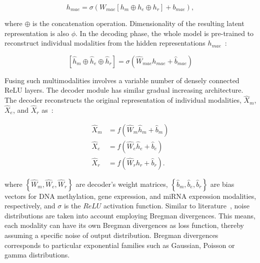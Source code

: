 \begin{equation}
    h_{mae}=\sigma\left(W_{mae}\left[h_{m} \oplus h_{e} \oplus h_{r}\right]+b_{mae}\right),
\end{equation}

\hspace*{3.5mm} where $\oplus$ is the concatenation operation. Dimensionality of the resulting latent representation is also $\phi$. In the decoding phase, the whole model is pre-trained to reconstruct individual modalities from the hidden representations $h_{mae}$~\cite{liu2016multimodal}:

\begin{equation}
    \left[\hat{h}_{m}\oplus \hat{h}_{e} \oplus \hat{h}_{r}
    \right]=\sigma\left(\hat W_{mae} h_{mae}+\hat {b}_{mae}\right)
\end{equation}

\hspace*{3.5mm} Fusing such multimodalities involves a variable number of densely connected ReLU layers. The decoder module has similar gradual increasing architecture. The decoder reconstructs the original representation of individual modalities, $\hat{X}_{m}$, $\hat{X}_{e}$, and $\hat{X}_{r}$ as~\cite{wang2018associativemulti}: 

\begin{equation}
    \begin{aligned}
        \hat{X}_{m} &=f\left(\hat W_{m} \hat{h}_{m}+\hat{b}_{m}\right) \\
        \hat{X}_{e} &=f\left(\hat W_{e} \hat{h}_{e}+\hat{b}_{e}\right) \\
        \hat{X}_{r} &=f\left(\hat W_{r} \hat{h}_{r}+\hat{b}_{r}\right).
        \end{aligned}
\end{equation}


\hspace*{3.5mm} where $\left\{\hat W_{m}, \hat W_{e}, \hat W_{r}\right\}$ are decoder's weight matrices, $\left\{\hat b_{m}, \hat b_{e}, \hat b_{r}\right\}$ are bias vectors for DNA methylation, gene expression, and miRNA expression modalities, respectively, and $\sigma$ is the $ReLU$ activation function. Similar to literature~\cite{wang2018associativemulti,serban2016multi}, noise distributions are taken into account employing Bregman divergences. This means, each modality can have its own Bregman divergences as loss function, thereby assuming a specific noise of output distribution. Bregman divergences corresponds to particular exponential families such as Gaussian, Poisson or gamma distributions. 

